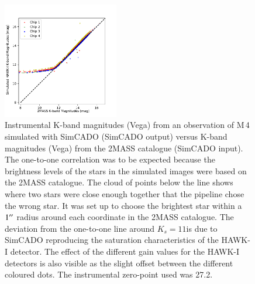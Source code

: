 \begin{figure}

    \centering
    \includegraphics[width=0.45\textwidth]{images/2MASS_vs_HAWKado_inst_mags_single}
    
    \caption{Instrumental K-band magnitudes (Vega) from an observation of M\,4 simulated with SimCADO (SimCADO output) versus K-band magnitudes (Vega) from the 2MASS catalogue (SimCADO input).
    The one-to-one correlation was to be expected because the brightness levels of the stars in the simulated images were based on the 2MASS catalogue.
    The cloud of points below the line shows where two stars were close enough together that the pipeline chose the wrong star.
    It was set up to choose the brightest star within a $1^{\prime\prime}$ radius around each coordinate in the 2MASS catalogue.
    The deviation from the one-to-one line around $K_{s}=11$\m is due to SimCADO reproducing the saturation characteristics of the HAWK-I detector.
    The effect of the different gain values for the HAWK-I detectors is also visible as the slight offset between the different coloured dots.
    The instrumental zero-point used was 27.2\m.}
    \label{fig:2mass_hawkado_flux_comparison}

\end{figure}

